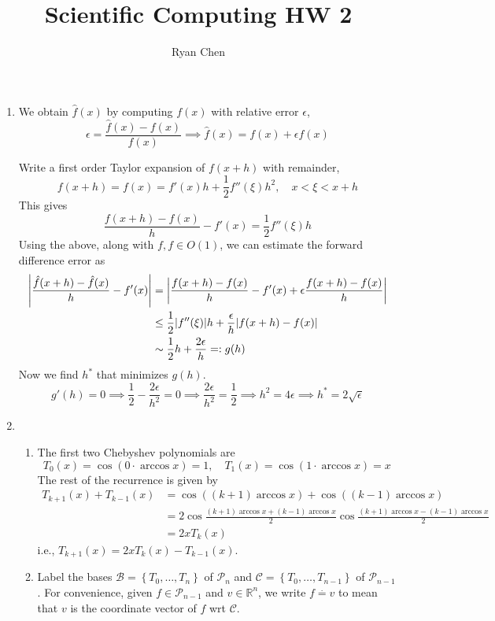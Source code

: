 \documentclass{article}
\title{Scientific Computing HW 2}
\author{Ryan Chen}
\def\mbb#1{\mathbb{#1}}
\def\mc#1{\mathcal{#1}}
\def\bR{\mbb{R}}
\newcommand{\brc}[1]{\left\{#1\right\}}
\newcommand{\e}{\epsilon}
\newcommand{\x}{\xi}
\newcommand{\imp}{\implies}
\newcommand{\rep}{\overset{.}{=}}
\begin{document}
	
\maketitle



\begin{enumerate}
	
	
	
	\item We obtain $\hat f(x)$ by computing $f(x)$ with relative error $\e$,
	\[\e = \frac{\hat f(x) - f(x)}{f(x)}
	\imp \hat f(x) = f(x) + \e f(x)\]
	
	Write a first order Taylor expansion of $f(x+h)$ with remainder,
	\[f(x+h) = f(x) = f'(x)h + \frac12f''(\x)h^2,
	\quad x < \x < x + h\]
	This gives
	\[\frac{f(x+h)-f(x)}{h} - f'(x) = \frac12f''(\x)h\]
	Using the above, along with $f,f\in O(1)$, we can estimate the forward difference error as
	\begin{align*}
		\abs{\frac{\hat f(x+h)-\hat f(x)}{h} - f'(x)} &= \abs{\frac{f(x+h)-f(x)}{h} - f'(x) + \e\frac{f(x+h)-f(x)}{h}} \\
		&\le \frac12|f''(\x)|h + \frac\e h|f(x+h)-f(x)| \\
		&\sim \frac12h + \frac{2\e}{h} =: g(h)
	\end{align*}
	Now we find $h^*$ that minimizes $g(h)$.
	\[g'(h) = 0
	\imp \frac12 - \frac{2\e}{h^2} = 0
	\imp \frac{2\e}{h^2} = \frac12
	\imp h^2 = 4\e
	\imp h^* = 2\sqrt\e\]
	
	
	
	\item
	
	\begin{enumerate}
		
		
		
		\item The first two Chebyshev polynomials are
		\[T_0(x) = \cos(0\cdot\arccos x) = 1,
		\quad T_1(x) = \cos(1\cdot\arccos x) = x\]
		The rest of the recurrence is given by
		\begin{align*}
			T_{k+1}(x) + T_{k-1}(x) &= \cos((k+1)\arccos x) + \cos((k-1)\arccos x) \\
			&= 2\cos\frac{(k+1)\arccos x+(k-1)\arccos x}{2}\cos\frac{(k+1)\arccos x-(k-1)\arccos x}{2} \\
			&= 2xT_k(x)
		\end{align*}
		i.e., $T_{k+1}(x)=2xT_k(x)-T_{k-1}(x)$.
		
		
		
		\item Label the bases $\mc B=\brc{T_0,\dots,T_n}$ of $\mc P_n$ and $\mc C=\brc{T_0,\dots,T_{n-1}}$ of $\mc P_{n-1}$. For convenience, given $f\in\mc P_{n-1}$ and $v\in\bR^n$, we write  $f\rep v$ to mean that $v$ is the coordinate vector of $f$ wrt $\mc C$.
		

\end{enumerate}
\end{enumerate}
\end{document}
